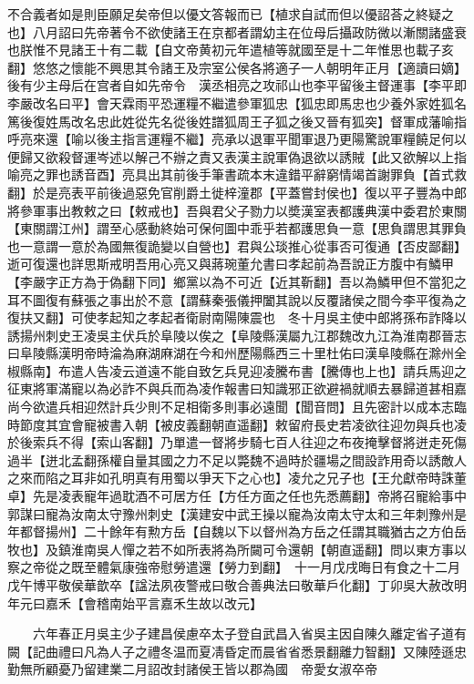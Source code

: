 不合義者如是則臣願足矣帝但以優文答報而已【植求自試而但以優詔荅之終疑之也】八月詔曰先帝著令不欲使諸王在京都者謂幼主在位母后攝政防微以漸關諸盛衰也朕惟不見諸王十有二載【自文帝黄初元年遣植等就國至是十二年惟思也載子亥翻】悠悠之懷能不興思其令諸王及宗室公侯各將適子一人朝明年正月【適讀曰嫡】後有少主母后在宫者自如先帝令　漢丞相亮之攻祁山也李平留後主督運事【李平即李嚴改名曰平】會天霖雨平恐運糧不繼遣參軍狐忠【狐忠即馬忠也少養外家姓狐名篤後復姓馬改名忠此姓從先名從後姓譜狐周王子狐之後又晉有狐突】督軍成藩喻指呼亮來還【喻以後主指言運糧不繼】亮承以退軍平聞軍退乃更陽驚說軍糧饒足何以便歸又欲殺督運岑述以解己不辦之責又表漢主說軍偽退欲以誘賊【此又欲解以上指喻亮之罪也誘音酉】亮具出其前後手筆書疏本末違錯平辭窮情竭首謝罪負【首式救翻】於是亮表平前後過惡免官削爵土徙梓潼郡【平蓋嘗封侯也】復以平子豐為中郎將參軍事出教敕之曰【敕戒也】吾與君父子勠力以奬漢室表都護典漢中委君於東關【東關謂江州】謂至心感動終始可保何圖中乖乎若都護思負一意【思負謂思其罪負也一意謂一意於為國無復詭變以自營也】君與公琰推心從事否可復通【否皮鄙翻】逝可復還也詳思斯戒明吾用心亮又與蔣琬董允書曰孝起前為吾說正方腹中有鱗甲【李嚴字正方為于偽翻下同】鄉黨以為不可近【近其靳翻】吾以為鱗甲但不當犯之耳不圖復有蘇張之事出於不意【謂蘇秦張儀押闔其說以反覆諸侯之間今李平復為之復扶又翻】可使孝起知之孝起者衛尉南陽陳震也　冬十月吳主使中郎將孫布詐降以誘揚州刺史王凌吳主伏兵於阜陵以俟之【阜陵縣漢屬九江郡魏改九江為淮南郡晉志曰阜陵縣漢明帝時淪為麻湖麻湖在今和州歷陽縣西三十里杜佑曰漢阜陵縣在滁州全椒縣南】布遣人告凌云道遠不能自致乞兵見迎凌騰布書【騰傳也上也】請兵馬迎之征東將軍滿寵以為必詐不與兵而為凌作報書曰知識邪正欲避禍就順去暴歸道甚相嘉尚今欲遣兵相迎然計兵少則不足相衛多則事必遠聞【聞音問】且先密計以成本志臨時節度其宜會寵被書入朝【被皮義翻朝直遥翻】敕留府長史若凌欲往迎勿與兵也凌於後索兵不得【索山客翻】乃單遣一督將步騎七百人往迎之布夜掩擊督將迸走死傷過半【迸北孟翻孫權自量其國之力不足以斃魏不過時於疆場之間設詐用奇以誘敵人之來而陷之耳非如孔明真有用蜀以爭天下之心也】凌允之兄子也【王允獻帝時誅董卓】先是凌表寵年過耽酒不可居方任【方任方面之任也先悉薦翻】帝將召寵給事中郭謀曰寵為汝南太守豫州刺史【漢建安中武王操以寵為汝南太守太和三年刺豫州是年都督揚州】二十餘年有勲方岳【自魏以下以督州為方岳之任謂其職猶古之方伯岳牧也】及鎮淮南吳人憚之若不如所表將為所闚可令還朝【朝直遥翻】問以東方事以察之帝從之既至體氣康強帝慰勞遣還【勞力到翻】　十一月戊戌晦日有食之十二月戊午博平敬侯華歆卒【諡法夙夜警戒曰敬合善典法曰敬華戶化翻】丁卯吳大赦改明年元曰嘉禾【會稽南始平言嘉禾生故以改元】

　　六年春正月吳主少子建昌侯慮卒太子登自武昌入省吳主因自陳久離定省子道有闕【記曲禮曰凡為人子之禮冬温而夏凊昏定而晨省省悉景翻離力智翻】又陳陸遜忠勤無所顧憂乃留建業二月詔改封諸侯王皆以郡為國　帝愛女淑卒帝

